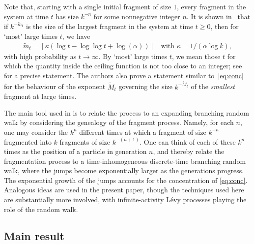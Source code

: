 \documentclass[a4,12pt]{amsart}
\numberwithin{equation}{section}
\begin{document}
	Note that, starting with a single initial fragment of size $1$, 
	every fragment in the system at time $t$ has size $k^{-n}$ for some nonnegative integer $n$.
	It is shown in~\cite{DGJPS} that if $k^{-\tilde{m}_t}$ is the size of the largest fragment 
	in the system at time $t \geq 0$, then for ‘most’ large times $t$, we have
	\begin{align} \label{eq:conc}
    		\tilde{m}_t = \left\lceil 
		\kappa \left( \log t - \log \log t + \log(\alpha) \right) \right\rceil
    		\quad \text{with } \kappa = 1/(\alpha \log k),
	\end{align}
	with high probability as $t \to \infty$.
	By ‘most’ large times $t$, we mean those $t$ for which the quantity inside the ceiling 
	function is not too close to an integer; see~\cite[Theorem A]{DGJPS} for a precise statement.
	The authors also prove a statement similar to~\eqref{eq:conc} for the behaviour of 
	the exponent $\tilde{M}_t$ 
	governing the size $k^{-\tilde{M}_t}$ of the \emph{smallest} fragment at large times.

	The main tool used in \cite{DGJPS} is to relate the process to an expanding 
	branching random walk 
	by considering the genealogy of the fragment process.
	Namely, for each $n$, one may consider the $k^{n}$ different times at which a fragment of size 
	$k^{-n}$ fragmented into $k$ fragments of size 
	$k^{-(n+1)}$. 
	One can think of each of these $k^n$ times as the position of a particle in 
	generation $n$, and thereby relate the fragmentation process to a time-inhomogeneous 
	discrete-time branching random walk, where the jumps become exponentially 
	larger as the generations progress. 
	The exponential growth of the jumps accounts for the concentration of \eqref{eq:conc}. 
	Analogous ideas are used in the present paper, though the techniques used here are
	substantially more involved, 
	with infinite-activity L\'evy processes playing the role of the random walk.


\subsection{Main result}
\end{document}
